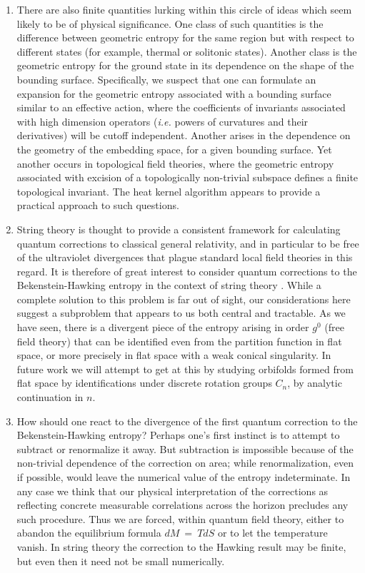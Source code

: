\documentclass[12pt]{article}
\begin{document}
\begin{enumerate}
\item There are also finite quantities lurking within this circle of ideas which
seem likely to be of physical significance.
One class of such quantities is the difference between
geometric entropy for the same region but with respect to different
states (for example, thermal or solitonic states). Another class is
the geometric entropy for the ground state in its dependence on the
shape of the bounding surface. Specifically, we suspect that one
can formulate an expansion for the geometric entropy associated with
a bounding surface similar to an effective action, where
the coefficients of invariants
associated with high dimension operators ({\it i.e.} powers of curvatures
and their derivatives) will be cutoff independent.
Another arises in the dependence on the geometry of the embedding
space, for a given bounding surface.
Yet another occurs in topological field theories, where the
geometric entropy associated with excision of a topologically
non-trivial subspace defines a finite topological invariant.
The heat kernel algorithm appears to provide a practical approach to such
questions.

\item String theory is thought to provide a consistent framework for
calculating quantum corrections to classical general relativity,
and in particular to be free of the ultraviolet
divergences that plague standard local field theories in this regard.
It is therefore of great interest to consider quantum corrections to
the Bekenstein-Hawking entropy in the context of string theory
\cite{susskind}.
While a complete solution to this problem is far out of sight, our
considerations
here suggest a subproblem that appears to us both central and tractable.
As we have seen, there is a divergent piece of the entropy arising in
order $g^0$ (free field theory) that can be identified even from the
partition function in flat space,
or
more precisely in flat space with a weak conical singularity.  In future
work we will attempt to
get at this by studying orbifolds \cite{orbi} formed from flat space
by identifications under discrete rotation groups $C_n$, by analytic
continuation in $n$.

\item How should one react to the divergence of the first quantum correction
to the Bekenstein-Hawking entropy?  Perhaps one's first instinct is
to attempt to subtract or renormalize it away.  But subtraction
is impossible because of the non-trivial dependence of the correction
on area; while renormalization, even if possible, would leave the
numerical value of the entropy indeterminate.  In any case
we think that our physical interpretation of the corrections as reflecting
concrete measurable correlations across the horizon precludes any
such procedure.  Thus we are forced, within quantum field theory,
either to abandon the equilibrium formula $dM ~=~ T dS$ or to
let the temperature vanish.  In string theory the correction to the
Hawking result may be finite, but even then it need not be small numerically.
\end{enumerate}
\end{document}
